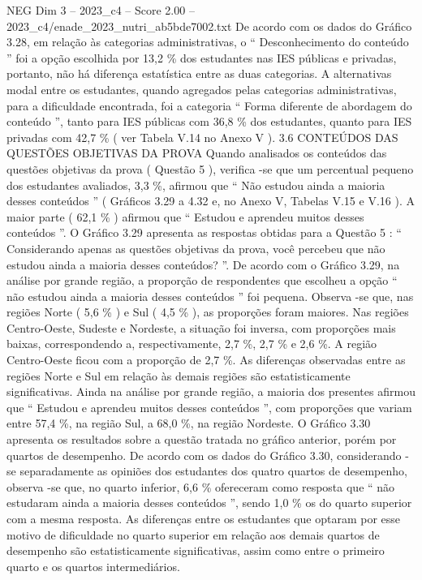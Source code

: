 \begin{textsample}{NEG Dim 3 – 2023\_c4 – Score 2.00 – 2023\_c4/enade\_2023\_nutri\_ab5bde7002.txt}
De acordo com os dados do Gráfico 3.28, em relação às categorias administrativas, o “ Desconhecimento do conteúdo ” foi a opção escolhida por 13,2 \% dos estudantes nas IES públicas e privadas, portanto, não há diferença estatística entre as duas categorias.
A alternativas modal entre os estudantes, quando agregados pelas categorias administrativas, para a dificuldade encontrada, foi a categoria “ Forma diferente de abordagem do conteúdo ”, tanto para IES públicas com 36,8 \% dos estudantes, quanto para IES privadas com 42,7 \% ( ver Tabela V.14 no Anexo V ). 3.6 CONTEÚDOS DAS QUESTÕES OBJETIVAS DA PROVA Quando analisados os conteúdos das questões objetivas da prova ( Questão 5 ), verifica -se que um percentual pequeno dos estudantes avaliados, 3,3 \%, afirmou que “ Não estudou ainda a maioria desses conteúdos ” ( Gráficos 3.29 a 4.32 e, no Anexo V, Tabelas V.15 e V.16 ).
A maior parte ( 62,1 \% ) afirmou que “ Estudou e aprendeu muitos desses conteúdos ”.
O Gráfico 3.29 apresenta as respostas obtidas para a Questão 5 : “ Considerando apenas as questões objetivas da prova, você percebeu que não estudou ainda a maioria desses conteúdos? ”.
De acordo com o Gráfico 3.29, na análise por grande região, a proporção de respondentes que escolheu a opção “ não estudou ainda a maioria desses conteúdos ” foi pequena.
Observa -se que, nas regiões Norte ( 5,6 \% ) e Sul ( 4,5 \% ), as proporções foram maiores.
Nas regiões Centro-Oeste, Sudeste e Nordeste, a situação foi inversa, com proporções mais baixas, correspondendo a, respectivamente, 2,7 \%, 2,7 \% e 2,6 \%.
A região Centro-Oeste ficou com a proporção de 2,7 \%.
As diferenças observadas entre as regiões Norte e Sul em relação às demais regiões são estatisticamente significativas.
Ainda na análise por grande região, a maioria dos presentes afirmou que “ Estudou e aprendeu muitos desses conteúdos ”, com proporções que variam entre 57,4 \%, na região Sul, a 68,0 \%, na região Nordeste.
O Gráfico 3.30 apresenta os resultados sobre a questão tratada no gráfico anterior, porém por quartos de desempenho.
De acordo com os dados do Gráfico 3.30, considerando -se separadamente as opiniões dos estudantes dos quatro quartos de desempenho, observa -se que, no quarto inferior, 6,6 \% ofereceram como resposta que “ não estudaram ainda a maioria desses conteúdos ”, sendo 1,0 \% os do quarto superior com a mesma resposta.
As diferenças entre os estudantes que optaram por esse motivo de dificuldade no quarto superior em relação aos demais quartos de desempenho são estatisticamente significativas, assim como entre o primeiro quarto e os quartos intermediários.

\end{textsample}
